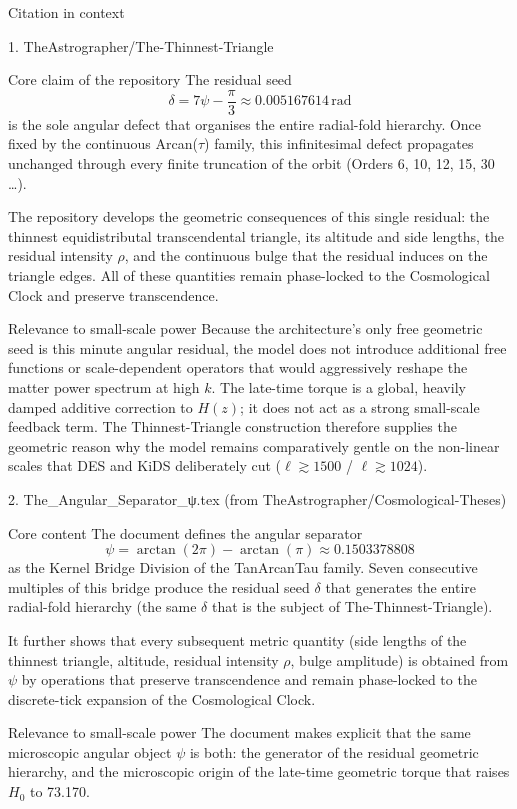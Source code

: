 Citation in context

1. TheAstrographer/The-Thinnest-Triangle

Core claim of the repository  
The residual seed  
\[
\delta = 7\psi - \frac{\pi}{3} \approx 0.005167614\,\mathrm{rad}
\]  
is the sole angular defect that organises the entire radial-fold hierarchy. Once fixed by the continuous Arcan(\(\tau\)) family, this infinitesimal defect propagates unchanged through every finite truncation of the orbit (Orders 6, 10, 12, 15, 30 \ldots).  

The repository develops the geometric consequences of this single residual: the thinnest equidistributal transcendental triangle, its altitude and side lengths, the residual intensity \(\rho\), and the continuous bulge that the residual induces on the triangle edges. All of these quantities remain phase-locked to the Cosmological Clock and preserve transcendence.

Relevance to small-scale power  
Because the architecture’s only free geometric seed is this minute angular residual, the model does not introduce additional free functions or scale-dependent operators that would aggressively reshape the matter power spectrum at high \(k\). The late-time torque is a global, heavily damped additive correction to \(H(z)\); it does not act as a strong small-scale feedback term. The Thinnest-Triangle construction therefore supplies the geometric reason why the model remains comparatively gentle on the non-linear scales that DES and KiDS deliberately cut (\(\ell \gtrsim 1500\) / \(\ell \gtrsim 1024\)).

2. The_Angular_Separator_ψ.tex  
(from TheAstrographer/Cosmological-Theses)

Core content  
The document defines the angular separator  
\[
\psi = \arctan(2\pi) - \arctan(\pi) \approx 0.1503378808
\]  
as the Kernel Bridge Division of the TanArcanTau family. Seven consecutive multiples of this bridge produce the residual seed \(\delta\) that generates the entire radial-fold hierarchy (the same \(\delta\) that is the subject of The-Thinnest-Triangle).  

It further shows that every subsequent metric quantity (side lengths of the thinnest triangle, altitude, residual intensity \(\rho\), bulge amplitude) is obtained from \(\psi\) by operations that preserve transcendence and remain phase-locked to the discrete-tick expansion of the Cosmological Clock.

Relevance to small-scale power  
The document makes explicit that the same microscopic angular object \(\psi\) is both:
the generator of the residual geometric hierarchy, and  
the microscopic origin of the late-time geometric torque that raises \(H_0\) to 73.170.  

